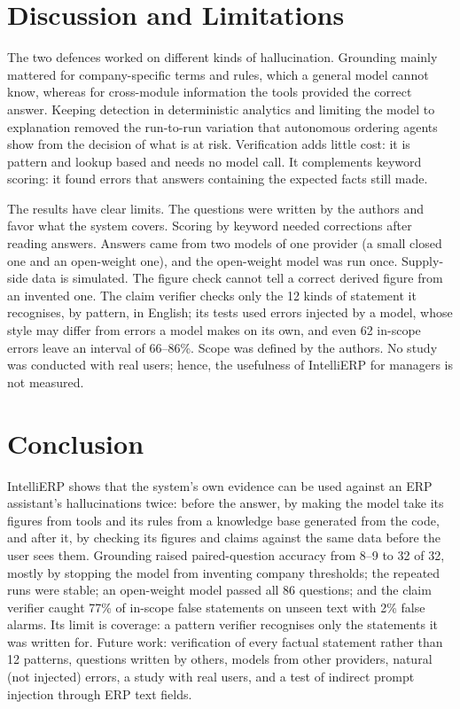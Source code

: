 \documentclass[conference]{IEEEtran}
\begin{document}
\section{Discussion and Limitations}

The two defences worked on different kinds of hallucination. Grounding mainly mattered for company-specific terms and rules, which a general model cannot know, whereas
for cross-module information the tools provided the correct answer. Keeping detection in deterministic analytics and limiting
the model to explanation removed the run-to-run variation that autonomous ordering agents show
\cite{long2026reliability} from the decision of what is at risk. Verification adds little cost: it is pattern
and lookup based and needs no model call. It complements keyword scoring: it found errors that answers
containing the expected facts still made.

The results have clear limits. The questions were written by the authors and favor what the
system covers. Scoring by keyword needed corrections after reading answers. Answers came from two models of one provider (a small closed one and an open-weight one), and the open-weight
model was run once. Supply-side data is simulated. The figure check cannot tell a correct derived figure from an
invented one. The claim verifier checks only the 12 kinds of statement it recognises, by pattern, in
English; its tests used errors injected by a model, whose style may differ from errors a model makes on its
own, and even 62 in-scope errors leave an interval of 66--86\%. Scope was defined by the authors.
No study was conducted with real users; hence, the usefulness of IntelliERP for managers is not measured.

\section{Conclusion}

IntelliERP shows that the system's own evidence can be used against an ERP assistant's hallucinations
twice: before the answer, by making the model take its figures from tools and its rules from a knowledge base
generated from the code, and after it, by checking its figures and claims against the same data before the
user sees them. Grounding raised paired-question accuracy from 8--9 to 32 of 32, mostly by stopping the model
from inventing company thresholds; the repeated runs were stable; an open-weight model passed all 86
questions; and the claim verifier caught 77\% of in-scope false statements on unseen text with 2\% false
alarms. Its limit is coverage: a pattern verifier recognises only the statements it was written for. Future
work: verification of every factual statement rather than 12 patterns, questions written by others, models
from other providers, natural (not injected) errors, a study with real users, and a test of indirect prompt
injection through ERP text fields.
\end{document}

